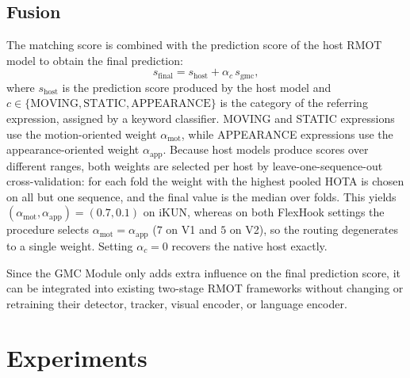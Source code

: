 \documentclass{article}
\makeatletter
\providecommand{\DIFadd}[1]{{\protect\color{blue}\uwave{#1}}} %
\providecommand{\DIFdel}[1]{{\protect\color{red}\sout{#1}}} %
\providecommand{\DIFaddbegin}{} %
\providecommand{\DIFaddend}{} %
\providecommand{\DIFdelbegin}{} %
\providecommand{\DIFdelend}{} %
\providecommand{\DIFscaledelfig}{0.5}
\newlength{\DIFdelgraphicswidth} %
\newlength{\DIFdelgraphicsheight} %
\providecommand{\DIFaddincludegraphics}[2][]{{\color{blue}\fbox{\DIFOincludegraphics[#1]{#2}}}} %
\providecommand{\DIFdelincludegraphics}[2][]{%
\sbox{\DIFdelgraphicsbox}{\DIFOincludegraphics[#1]{#2}}%
\settoboxwidth{\DIFdelgraphicswidth}{\DIFdelgraphicsbox} %
\settoboxtotalheight{\DIFdelgraphicsheight}{\DIFdelgraphicsbox} %
\scalebox{\DIFscaledelfig}{%
\parbox[b]{\DIFdelgraphicswidth}{\usebox{\DIFdelgraphicsbox}\\[-\baselineskip] \rule{\DIFdelgraphicswidth}{0em}}\llap{\resizebox{\DIFdelgraphicswidth}{\DIFdelgraphicsheight}{%
\setlength{\unitlength}{\DIFdelgraphicswidth}%
\begin{picture}(1,1)%
\thicklines\linethickness{2pt} %
{\color[rgb]{1,0,0}\put(0,0){\framebox(1,1){}}}%
{\color[rgb]{1,0,0}\put(0,0){\line( 1,1){1}}}%
{\color[rgb]{1,0,0}\put(0,1){\line(1,-1){1}}}%
\end{picture}%
}\hspace*{3pt}}} %
} %
\DeclareRobustCommand{\DIFaddbegin}{\DIFOaddbegin \let\includegraphics\DIFaddincludegraphics} %
\DeclareRobustCommand{\DIFaddend}{\DIFOaddend \let\includegraphics\DIFOincludegraphics} %
\DeclareRobustCommand{\DIFdelbegin}{\DIFOdelbegin \let\includegraphics\DIFdelincludegraphics} %
\DeclareRobustCommand{\DIFdelend}{\DIFOaddend \let\includegraphics\DIFOincludegraphics} %
\let\sout@orig\sout %
\renewcommand{\sout}[1]{\ifmmode\text{\sout@orig{\ensuremath{#1}}}\else\sout@orig{#1}\fi} %
\makeatother
\begin{document}
\subsection{Fusion}
\label{sec:fusion}
The matching score is combined with the prediction score of the host RMOT model to obtain the final prediction:
\begin{equation}
  s_{\mathrm{final}} = s_{\mathrm{host}} + \alpha_{c}\,s_{\mathrm{gmc}},
  \label{eq:fusion}
\end{equation}
where $s_{\mathrm{host}}$ is the prediction score produced by the host model and $c\in\{\mathrm{MOVING},\mathrm{STATIC},\mathrm{APPEARANCE}\}$ is the category of the referring expression, assigned by a keyword classifier. MOVING and STATIC expressions use the motion-oriented weight $\alpha_{\mathrm{mot}}$, while APPEARANCE expressions use the appearance-oriented weight $\alpha_{\mathrm{app}}$. Because host models produce scores over different ranges, both weights are selected per host by leave-one-sequence-out cross-validation: for each fold the weight with the highest pooled HOTA is chosen on all but one sequence, and the final value is the median over folds. This yields \DIFdelbegin \DIFdel{$(\alpha_{\mathrm{mot}},\alpha_{\mathrm{app}})=(0.7,0.1)$ }\DIFdelend \DIFaddbegin \DIFadd{$(\alpha_{\mathrm{mot}},\alpha_{\mathrm{app}})=(1.0,0.1)$ }\DIFaddend on iKUN, whereas on both FlexHook settings the procedure selects $\alpha_{\mathrm{mot}}=\alpha_{\mathrm{app}}$ ($7$ on V1 and $5$ on V2), so the routing degenerates to a single weight. Setting $\alpha_c=0$ recovers the native host exactly.


Since the GMC Module only adds extra influence on the final prediction score, it can be integrated into existing two-stage RMOT frameworks without changing or retraining their detector, tracker, visual encoder, or language encoder.

\section{Experiments}
\label{sec:exp}
\end{document}
